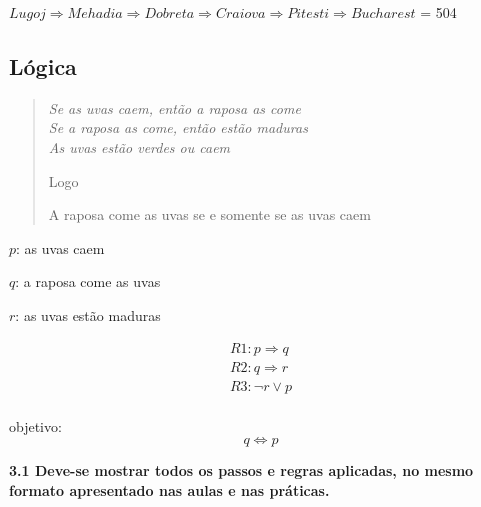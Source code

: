 $Lugoj \Rightarrow Mehadia \Rightarrow Dobreta \Rightarrow Craiova \Rightarrow Pitesti \Rightarrow Bucharest$ = 504

\subsection{Lógica}
\begin{adjustwidth}{3em}{}
\begin{quote}
    \itshape
    Se as uvas caem, então a raposa as come \\
    Se a raposa as come, então estão maduras \\
    As uvas estão verdes ou caem

    Logo

    A raposa come as uvas se e somente se as uvas caem
\end{quote}
\end{adjustwidth}

$p$: as uvas caem 

$q$: a raposa come as uvas 

$r$: as uvas estão maduras

\begin{equation*}
    \begin{gathered}
        R1: p \Rightarrow q \\
        R2: q \Rightarrow r \\
        R3: \neg{r} \lor p \\
    \end{gathered}
\end{equation*}

objetivo: 
\begin{equation*}
    q \Leftrightarrow p
\end{equation*}



\begin{adjustwidth}{1em}{}
\textbf{3.1 Deve-se mostrar todos os passos e regras aplicadas, no mesmo formato
apresentado nas aulas e nas práticas.}
\end{adjustwidth}


